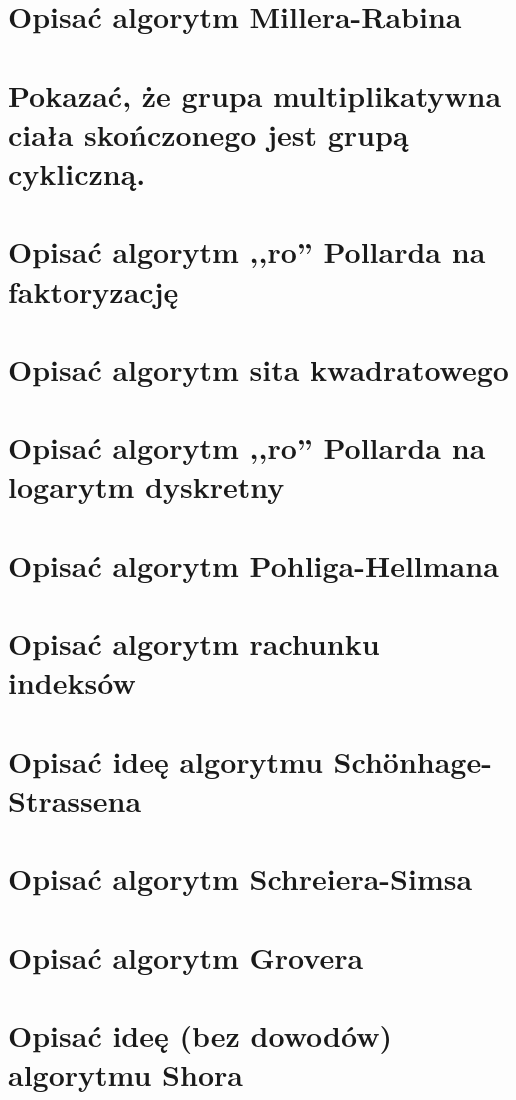 \section{Opisać algorytm Millera-Rabina}


\section{Pokazać, że grupa multiplikatywna ciała skończonego jest grupą cykliczną.}


\section{Opisać algorytm ,,ro'' Pollarda na faktoryzację}


\section{Opisać algorytm sita kwadratowego}


\section{Opisać algorytm ,,ro'' Pollarda na logarytm dyskretny}


\section{Opisać algorytm Pohliga-Hellmana}


\section{Opisać algorytm rachunku indeksów}


\section{Opisać ideę algorytmu Sch{\"o}nhage-Strassena}


\section{Opisać algorytm Schreiera-Simsa}


\section{Opisać algorytm Grovera}


\section{Opisać ideę (bez dowodów) algorytmu Shora}
